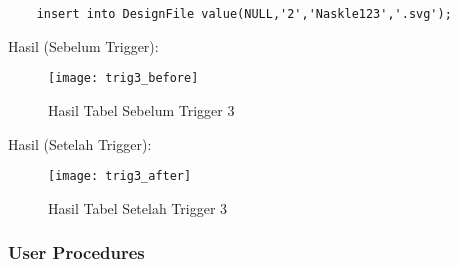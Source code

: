\begin{enumerate}
\begin{lstlisting}
	insert into DesignFile value(NULL,'2','Naskle123','.svg');
			\end{lstlisting}
		Hasil (Sebelum Trigger):
		\\
		\begin{figure}[H]
			\centering
			\texttt{[image: trig3\_before]}
			\caption{Hasil Tabel Sebelum Trigger 3}
		\end{figure}
		Hasil (Setelah Trigger):
		\begin{figure}[H]
			\centering
			\texttt{[image: trig3\_after]}
			\caption{Hasil Tabel Setelah Trigger 3}
		\end{figure}
\end{enumerate}
\subsubsection{User Procedures}
